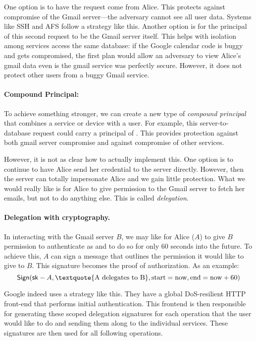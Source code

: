 One option is to have the request come from Alice. This protects against compromise of the Gmail server---the adversary cannot see all user data. Systems like SSH and AFS follow a strategy like this. Another option is for the principal of this second request to be the Gmail server itself. This helps with isolation among services access the same database: if the Google calendar code is buggy and gets compromised, the first plan would allow an adversary to view Alice's gmail data even is the gmail service was perfectly secure. However, it does not protect other users from a buggy Gmail service.

\paragraph{Compound Principal: }
To achieve something stronger, we can create a new type of \emph{compound principal} that combines a service or device with a user. For example, this server-to-database request could carry a principal of . This provides protection against both gmail server compromise and against compromise of other services.

However, it is not as clear how to actually implement this. One option is to continue to have Alice send her credential to the server directly. However, then the server can totally impersonate Alice and we gain little protection. What we would really like is for Alice to give permission to the Gmail server to fetch her emails, but not to do anything else. This is called \emph{delegation}.

\paragraph{Delegation with cryptography.}
In interacting with the Gmail server $B$, we may like for Alice ($A$) to give $B$ permission to authenticate as  and to do so for only 60 seconds into the future. To achieve this, $A$ can sign a message that outlines the permission it would like to give to $B$. This signature becomes the proof of authorization. As an example:
\[ \Sign(\sk-A, \text{\textquote{A delegates to B}}, \text{start}=\text{now}, \text{end}=\text{now}+60) \]

Google indeed uses a strategy like this. They have a global DoS-resilient HTTP front-end that performs initial authentication. This frontend is then responsible for generating these scoped delegation signatures for each operation that the user would like to do and sending them along to the individual services. These signatures are then used for all following operations.

